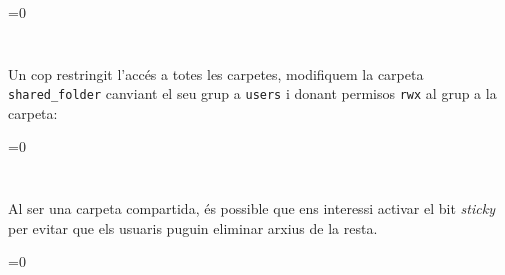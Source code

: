 \documentclass[12pt, oneside]{article}
\newcommand{\preg}[2][0]{
    \ifnum#1=0
        \inputminted[firstline=#2, lastline=#2]{shell-session}{preg6}
    \else
        \inputminted[firstline=#1, lastline=#2]{shell-session}{preg6}
    \fi
    \vspace{-2em}
}
\begin{document}
\begin{enumerate}
    \preg{4}

    Un cop restringit l'accés a totes les carpetes, modifiquem la carpeta
    \texttt{shared\_folder} canviant el seu grup a \texttt{users} i donant
    permisos \texttt{rwx} al grup a la carpeta:

    \preg[5]{6}

    Al ser una carpeta compartida, és possible que ens interessi activar el bit
    \emph{sticky} per evitar que els usuaris puguin eliminar arxius de la resta.

    \preg{7}

\end{enumerate}
\end{document}
